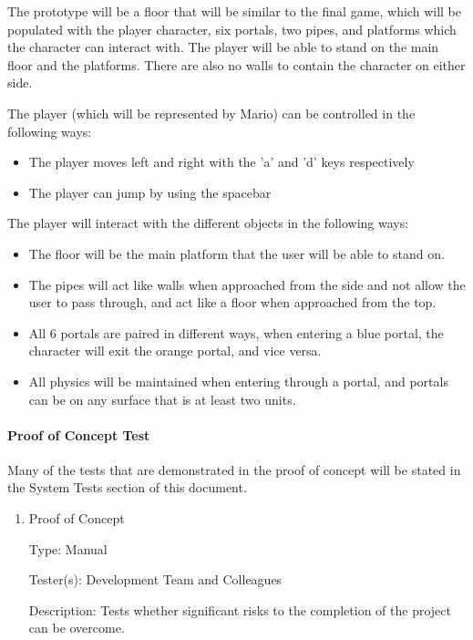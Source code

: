 \documentclass[12pt, titlepage]{article}
\begin{document}
The prototype will be a floor that will be similar to the final game, which will be populated with the player character, six portals, two pipes, and platforms which the character can interact with. The player will be able to stand on the main floor and the platforms. There are also no walls to contain the character on either side.

The player (which will be represented by Mario) can be controlled in the following ways:
\begin{itemize}  
\item The player moves left and right with the 'a' and 'd' keys respectively
\item The player can jump by using the spacebar
\end{itemize}


The player will interact with the different objects in the following ways:
\begin{itemize}  
\item The floor will be the main platform that the user will be able to stand on.
\item The pipes will act like walls when approached from the side and not allow the user to pass through, and act like a floor when approached from the top.
\item All 6 portals are paired in different ways, when entering a blue portal, the character will exit the orange portal, and vice versa.
\item All physics will be maintained when entering through a portal, and portals can be on any surface that is at least two units.
\end{itemize}


\paragraph{Proof of Concept Test}

Many of the tests that are demonstrated in the proof of concept will be stated in the System Tests section of this document.

\begin{enumerate}

\item{Proof of Concept}

Type: Manual

Tester(s): Development Team and Colleagues

Description: Tests whether significant risks to the completion of the project can be overcome.

\end{enumerate}
	
\end{document}
